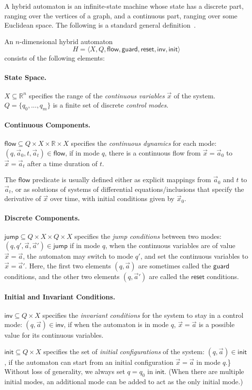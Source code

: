 \documentclass[envcountsect]{llncs}
\newcommand{\flow}{\mathsf{flow}}
\newcommand{\jump}{\mathsf{jump}}
\newcommand{\inv}{\mathsf{inv}}
\newcommand{\init}{\mathsf{init}}
\newcommand{\guard}{\mathsf{guard}}
\newcommand{\reset}{\mathsf{reset}}
\newcommand{\R}{\mathbb{R}}
\begin{document}
A hybrid automaton is an infinite-state machine whose state has a discrete part,
 ranging over the vertices of a graph, and a continuous part, ranging over some
Euclidean space.  The following is a standard general definition~\cite{}. 
\begin{definition}\label{auto-def}
An $n$-dimensional hybrid automaton $$H   = \langle X, Q, \flow,
\guard, \reset, \inv, \init\rangle$$ consists of the following elements: 
\paragraph{\bf State Space.} $X\subseteq \mathbb{R}^n$ specifies the range of
the {\em continuous variables}  $\vec x$ of the system. $Q=\{q_0,...,q_m\}$ is
a finite set of discrete {\em control modes}. 

\paragraph{\bf Continuous Components.} $\flow \subseteq Q\times
X\times \R \times X$ specifies the {\em continuous dynamics}
for each mode: $(q, \vec a_0, t, \vec a_t)\in \flow$, if in mode $q$,
there is a continuous flow from $\vec x =\vec a_0$ to $\vec x = \vec a_t$
after a time duration of $t$. 

The $\flow$ predicate is usually defined either as explicit mappings from
$\vec a_0$ and $t$ to $\vec a_t$,  or as solutions of systems of differential
equations/inclusions that specify the derivative of $\vec x$ over time, with
initial conditions given by $\vec x_0$. 

\paragraph{\bf Discrete Components.} $\jump\subseteq Q\times
X\times Q\times X$ specifies the {\em jump conditions}
between two modes: $(q,q',\vec a,\vec a')\in \jump$ if in mode $q$,
when the continuous variables are of value $\vec x = \vec a$, the automaton may
switch to mode $q'$, and set the continuous variables to $\vec x = \vec
a'$.  Here, the first two elements $(q, \vec a)$ are sometimes called the
$\guard$ conditions, and the other two elements $(q, \vec a')$ are called the
$\reset$ conditions. 

\paragraph{\bf Initial and Invariant Conditions.} $\inv \subseteq Q\times X$
specifies the {\em invariant conditions} for 
the system to stay in a control mode: $(q,\vec a)\in \inv$, if when the
automaton is in mode $q$, $\vec x = \vec a$ is a possible value for its
continuous variables.

$\init \subseteq Q\times X$ specifies the set of {\em
initial configurations} of the system: $(q, \vec a)\in \init$, if the
automaton can start from an initial configuration $\vec x = \vec a$ in mode
$q$.\} Without loss of generality, we always set $q=q_0$ in $\init$. (When there
are multiple initial modes, an additional mode can be
added to act as the only initial mode.)  
\end{definition}
\end{document}
